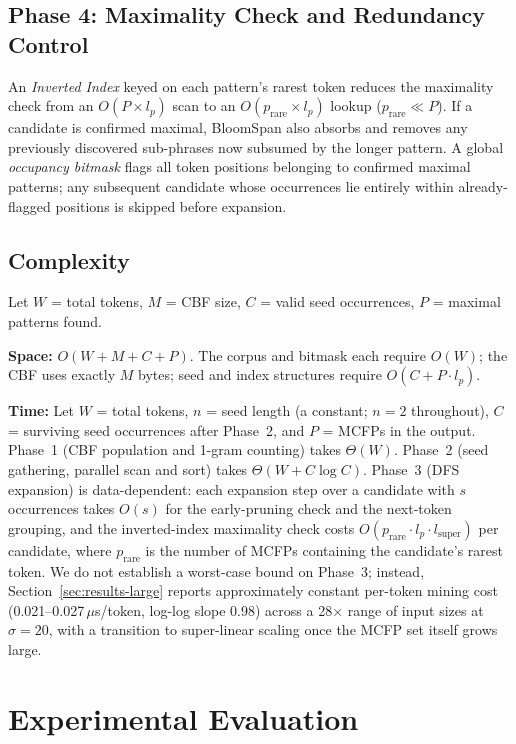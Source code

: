 \documentclass[runningheads]{llncs}
\begin{document}
    \subsection{Phase 4: Maximality Check and Redundancy Control}
    An \emph{Inverted Index} keyed on each pattern's rarest token reduces the maximality check from an $O(P \times l_p)$ scan to an $O(p_\text{rare} \times l_p)$ lookup ($p_\text{rare} \ll P$). If a candidate is confirmed maximal, BloomSpan also absorbs and removes any previously discovered sub-phrases now subsumed by the longer pattern. A global \emph{occupancy bitmask} flags all token positions belonging to confirmed maximal patterns; any subsequent candidate whose occurrences lie entirely within already-flagged positions is skipped before expansion.

    \subsection{Complexity}
    Let $W$ = total tokens, $M$ = CBF size, $C$ = valid seed occurrences, $P$ = maximal patterns found.

    \textbf{Space:} $O(W + M + C + P)$. The corpus and bitmask each require $O(W)$; the CBF uses exactly $M$ bytes; seed and index structures require $O(C + P \cdot l_p)$.

    \textbf{Time:} Let $W$ = total tokens, $n$ = seed length (a constant; $n = 2$ throughout), $C$ = surviving seed occurrences after Phase~2, and $P$ = MCFPs in the output. Phase~1 (CBF population and 1-gram counting) takes $\Theta(W)$. Phase~2 (seed gathering, parallel scan and sort) takes $\Theta(W + C \log C)$. Phase~3 (DFS expansion) is data-dependent: each expansion step over a candidate with $s$ occurrences takes $O(s)$ for the early-pruning check and the next-token grouping, and the inverted-index maximality check costs $O(p_\text{rare} \cdot l_p \cdot l_\text{super})$ per candidate, where $p_\text{rare}$ is the number of MCFPs containing the candidate's rarest token. We do not establish a worst-case bound on Phase~3; instead, Section~\ref{sec:results-large} reports approximately constant per-token mining cost (0.021–0.027\,$\mu$s/token, log-log slope 0.98) across a 28$\times$ range of input sizes at $\sigma = 20$, with a transition to super-linear scaling once the MCFP set itself grows large.

    \section{Experimental Evaluation}
\end{document}
